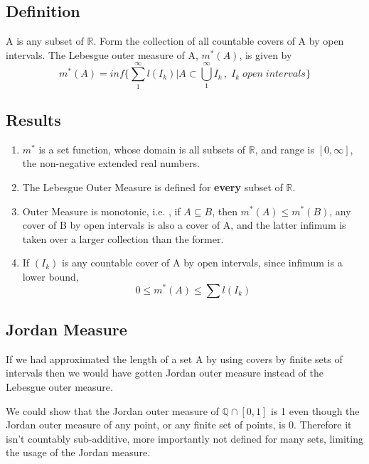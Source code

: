 \documentclass{article}
\begin{document}
\subsection{Definition}

A is any subset of $\mathbb{R}$. Form the collection of all countable covers of A by open intervals. The Lebesgue outer measure of A, $m^*(A)$, is given by
$$m^*(A)= inf\Big\{\sum_{1}^{\infty}l(I_k)| A \subset \bigcup_{1}^{\infty} I_k \, , \; I_k \; open \; intervals\Big\}$$

\subsection{Results}
\begin{enumerate}
    \item $m^*$ is a set function, whose domain is all subsets of $\mathbb{R}$, and range is $[0,\infty]$, the non-negative extended real numbers. 
    
    \item The Lebesgue Outer Measure is defined for \textbf{every} subset of $\mathbb{R}$.
    
    \item Outer Measure is monotonic, i.e. , if $A \subseteq B$, then $m^*(A) \leq m^*(B)$, any cover of B by open intervals is also a cover of A, and the latter infimum is taken over a larger collection than the former. 

    \item If $(I_k)$ is any countable cover of A by open intervals, since infimum is a lower bound,$$ 0 \leq m^*(A) \leq \sum l(I_k)$$
    


\end{enumerate}

\subsection{Jordan Measure}

If we had approximated the length of a set A by using covers by finite sets of intervals then we would have gotten Jordan outer measure instead of the Lebesgue outer measure. 

We could show that the Jordan outer measure of $ \mathbb{Q} \cap[0,1]$ is 1 even though the Jordan outer measure of any point, or any finite set of points, is 0. Therefore it isn't countably sub-additive, more importantly not defined for many sets, limiting the usage of the Jordan measure.
\end{document}
